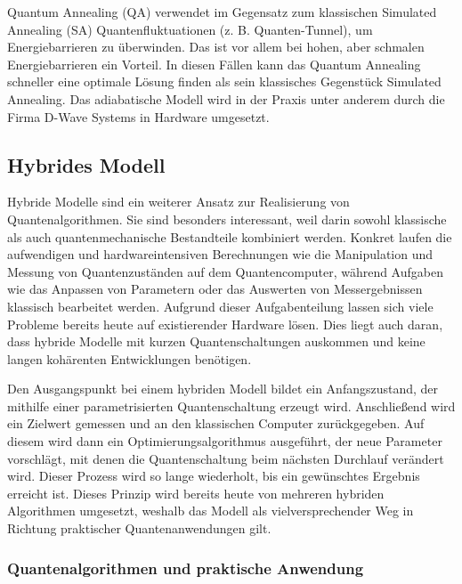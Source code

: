 Quantum Annealing (QA) verwendet im Gegensatz zum klassischen Simulated Annealing (SA) Quantenfluktuationen (z. B. Quanten-Tunnel), um Energiebarrieren zu überwinden. Das ist vor allem bei hohen, aber schmalen Energiebarrieren ein Vorteil. In diesen Fällen kann das Quantum Annealing schneller eine optimale Lösung finden als sein klassisches Gegenstück Simulated Annealing. Das adiabatische Modell wird in der Praxis unter anderem durch die Firma D-Wave Systems in Hardware umgesetzt. \autocite[2-4]{rajak_quantum_2022} \autocite[4-5, 42-43]{albash_adiabatic_2018}

\subsection{Hybrides Modell}

Hybride Modelle sind ein weiterer Ansatz zur Realisierung von Quantenalgorithmen. Sie sind besonders interessant, weil darin sowohl klassische als auch quantenmechanische Bestandteile kombiniert werden. Konkret laufen die aufwendigen und hardwareintensiven Berechnungen wie die Manipulation und Messung von Quantenzuständen auf dem Quantencomputer, während Aufgaben wie das Anpassen von Parametern oder das Auswerten von Messergebnissen klassisch bearbeitet werden. Aufgrund dieser Aufgabenteilung lassen sich viele Probleme bereits heute auf existierender Hardware lösen. Dies liegt auch daran, dass hybride Modelle mit kurzen Quantenschaltungen auskommen und keine langen kohärenten Entwicklungen benötigen. \autocite[1-2]{cerezo_variational_2022}

Den Ausgangspunkt bei einem hybriden Modell bildet ein Anfangszustand, der mithilfe einer parametrisierten Quantenschaltung erzeugt wird. Anschließend wird ein Zielwert gemessen und an den klassischen Computer zurückgegeben. Auf diesem wird dann ein Optimierungsalgorithmus ausgeführt, der neue Parameter vorschlägt, mit denen die Quantenschaltung beim nächsten Durchlauf verändert wird. Dieser Prozess wird so lange wiederholt, bis ein gewünschtes Ergebnis erreicht ist. Dieses Prinzip wird bereits heute von mehreren hybriden Algorithmen umgesetzt, weshalb das Modell als vielversprechender Weg in Richtung praktischer Quantenanwendungen gilt.

\subsubsection*{Quantenalgorithmen und praktische Anwendung}

